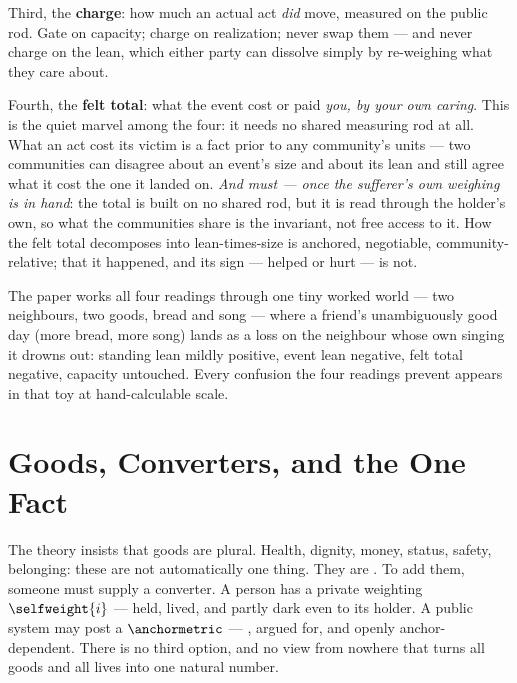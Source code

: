 \documentclass[../main_explainer]{subfiles}
\begin{document}
Third, the \textbf{charge}: how much an actual act \emph{did} move, measured on the
public rod. Gate on capacity; charge on realization; never swap them --- and never
charge on the lean, which either party can dissolve simply by re-weighing what they care
about.

Fourth, the \textbf{felt total}: what the event cost or paid \emph{you, by your own
caring}. This is the quiet marvel among the four: it needs no shared measuring rod at
all. What an act cost its victim is a fact prior to any community's units --- two
communities can disagree about an event's size and about its lean and still agree what
it cost the one it landed on. \emph{And must --- once the sufferer's own weighing is in
hand}: the total is built on no shared rod, but it is read through the holder's own, so
what the communities share is the invariant, not free access to it. How the felt total
decomposes into
lean-times-size is anchored, negotiable, community-relative; that it happened, and its
sign --- helped or hurt --- is not.

The paper works all four readings through one tiny worked world --- two neighbours, two
goods, bread and song --- where a friend's unambiguously good day (more bread, more
song) lands as a loss on the neighbour whose own singing it drowns out: standing lean
mildly positive, event lean negative, felt total negative, capacity untouched. Every
confusion the four readings prevent appears in that toy at hand-calculable scale.

%


\section{Goods, Converters, and the One Fact}
\label{sec:explainer:goods}

The theory insists that goods are plural. Health, dignity, money, status, safety,
belonging: these are not automatically one thing. They are
. To add them, someone must supply a converter. A person has a private weighting
$\selfweight{i}$ --- held, lived, and partly dark even to its holder. A public system
may post a 
$\anchormetric$ --- , argued for, and openly anchor-dependent. There is no third option, and no view
from nowhere that turns all goods and all lives into one natural number.
\end{document}
